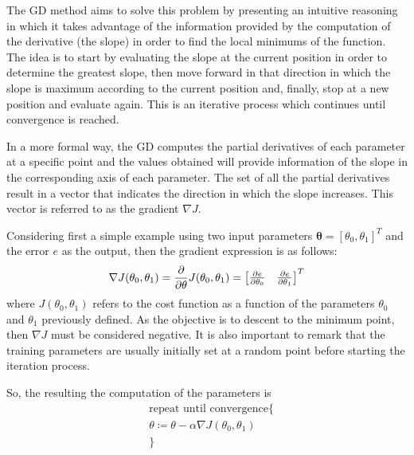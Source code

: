 \documentclass[a4paper, report, oneside, UKenglish]{memoir}
\newcommand{\btheta}{\boldsymbol{\theta}}
\begin{document}
The GD method aims to solve this problem by presenting an intuitive reasoning in which it takes advantage of the information provided by the computation of the derivative (the slope) in order to find the local minimums of the function. The idea is to start by evaluating the slope at the current position in order to determine the greatest slope, then move forward in that direction in which the slope is maximum according to the current position and, finally, stop at a new position and evaluate again. This is an iterative process which continues until convergence is reached. 

In a more formal way, the GD computes the partial derivatives of each parameter at a specific point and the values obtained will provide information of the slope in the corresponding axis of each parameter. The set of all the partial derivatives result in a vector that indicates the direction in which the slope increases. This vector is referred to as the gradient $\nabla J$. 

Considering first a simple example using two input parameters $\btheta = [\theta_{0}, \theta_{1}]^T$ and the error $e$ as the output, then the gradient expression is as follows:
\begin{equation}
    \nabla J(\theta_{0},\theta_{1}) = \pdv{}{\theta} J(\theta_{0},\theta_{1}) = \begin{bmatrix}
                                                                                \pdv{e}{\theta_{0}} &                                 \pdv{e}{\theta_{1}}\\
                                                                                \end{bmatrix}^T
\end{equation}
where $J(\theta_{0},\theta_{1})$ refers to the cost function as a function of the parameters $\theta_{0}$ and $\theta_{1}$ previously defined. As the objective is to descent to the minimum point, then $\nabla J$ must be considered negative. It is also important to remark that the training parameters are usually initially set at a random point before starting the iteration process.

So, the resulting the computation of the parameters is
\begin{equation}\label{eq:gdeq}
\begin{split}
    &\mbox{repeat until convergence}\{\\
    &\theta \coloneqq \theta - \alpha \nabla J(\theta_{0},\theta_{1})\\
&\}
\end{split}
\end{equation}
\end{document}

